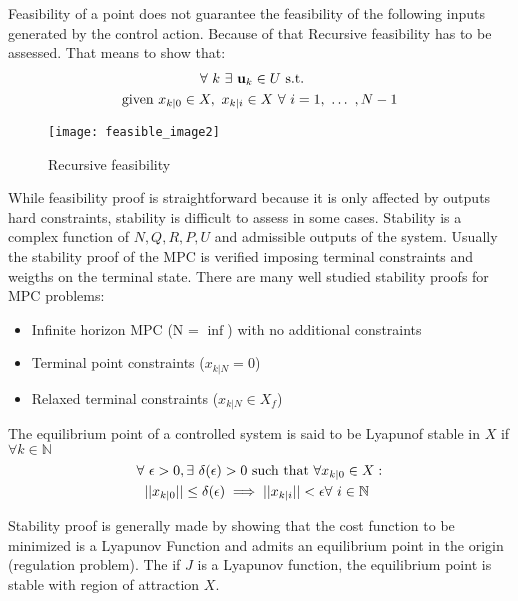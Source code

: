  Feasibility of a point does not guarantee the feasibility of the following inputs generated by the control action. Because of that Recursive feasibility has to be assessed. That means to show that:
 \begin{equation}
 \begin{split}
  &\ \ \ \ \ \ \ \ \ \forall\ k\ \exists\  \textbf{u}_k\in U\  \textnormal{s.t. } \\ 
  \textnormal{given } &x_{k|0} \in X, \  x_{k|i} \in X\  \forall\ i = 1,\  \dots\ , N-1   
 \end{split}
 \end{equation}
\begin{figure}[h!]
	\centering
	\texttt{[image: feasible\_image2]}
	\caption{Recursive feasibility}
	\label{feasible_image2}
\end{figure}

While feasibility proof is straightforward because it is only affected by outputs hard constraints, stability is difficult to assess in some cases.
Stability is a complex function of $N, Q, R, P, U$ and admissible outputs of the system.
Usually the stability proof of the MPC is verified imposing terminal constraints and weigths on the terminal state. There are many well studied stability proofs for MPC problems:

\begin{itemize}
\item Infinite horizon MPC (N = $\inf$) with no additional constraints
\item Terminal point constraints ($x_{k|N}=0$)
\item Relaxed terminal constraints ($x_{k|N} \in X_f $)
\end{itemize}

The equilibrium point of a controlled system is said to be Lyapunof stable in $X$ if $\forall k \in \mathbb{N}$
\begin{equation}
\begin{split}
\forall&\ \epsilon > 0, \exists\ \delta(\epsilon) >0 \textnormal{ such that } \forall x_{k|0} \in X : \\
&||x_{k|0}|| \leq \delta(\epsilon) \implies ||x_{k|i}|| < \epsilon \forall\ i \in \mathbb{N}
\end{split}
\end{equation}

Stability proof is generally made by showing that the cost function to be minimized is a Lyapunov Function and admits an equilibrium point in the origin (regulation problem). The if $J$ is a Lyapunov function, the equilibrium point is stable with region of attraction $X$.

